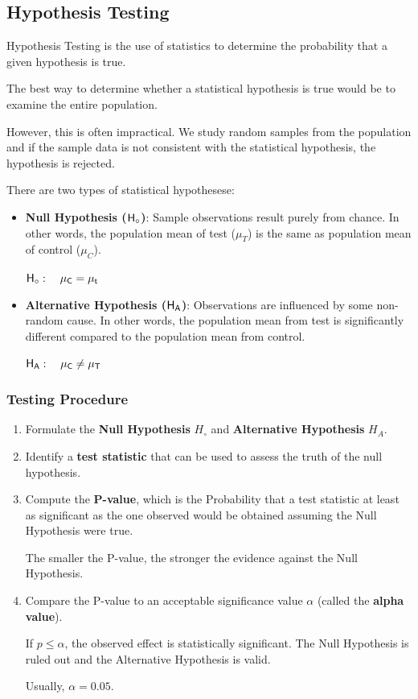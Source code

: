 \documentclass[twocolumn]{article}
\begin{document}
\subsection{Hypothesis Testing}

Hypothesis Testing is the use of statistics to determine the probability that a given hypothesis is true. 

The best way to determine whether a statistical hypothesis is true would be to examine the entire population.

However, this is often impractical. We study random samples from the population and if the sample data is not consistent with the statistical hypothesis, the hypothesis is rejected.

There are two types of statistical hypothesese:

\begin{itemize}
    \item \textbf{Null Hypothesis ($\sf H_{\circ}$)}: Sample observations result purely from chance. In other words, the population mean of test ($\mu_T$) is the same as population mean of control ($\mu_C$).
    
    $\sf H_{\circ}: \quad \mu_C = \mu_t$

    \item \textbf{Alternative Hypothesis ($\sf H_A$)}: Observations are influenced by some non-random cause. In other words, the population mean from test is significantly different compared to the population mean from control.
    
    $\sf H_A: \quad \mu_C \neq \mu_T$

\end{itemize}

\subsubsection{Testing Procedure}

\begin{enumerate}
    \item Formulate the \textbf{Null Hypothesis} $H_{\circ}$ and \textbf{Alternative Hypothesis} $H_A$. 
    \item Identify a \textbf{test statistic} that can be used to assess the truth of the null hypothesis.
    \item Compute the \textbf{P-value}, which is the Probability that a test statistic at least as significant as the one observed would be obtained assuming the Null Hypothesis were true. 
    
    The smaller the P-value, the stronger the evidence against the Null Hypothesis.

    \item Compare the P-value to an acceptable significance value $\alpha$ (called the \textbf{alpha value}). 
    
    If $p \leqslant \alpha$, the observed effect is statistically significant. The Null Hypothesis is ruled out and the Alternative Hypothesis is valid.
    
    Usually, $\alpha = 0.05$. 
\end{enumerate}
    
\end{document}
